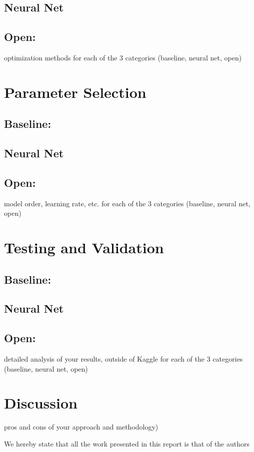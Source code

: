 \documentclass{acm_proc_article-sp}
\begin{document}
\subsection{Neural Net}

\subsection{Open: }
optimization methods  for each of the 3 categories (baseline, neural net, open)


\section{Parameter Selection}



\subsection{Baseline: }

\subsection{Neural Net}

\subsection{Open: }
model	order,	learning	rate,	etc.  for each of the 3 categories (baseline, neural net, open)

\section{Testing and Validation}


\subsection{Baseline: }

\subsection{Neural Net}

\subsection{Open: }
detailed	analysis of	your	results,	outside	of	Kaggle  for each of the 3 categories (baseline, neural net, open)



\section{Discussion}
pros and cons	of	your	approach and	methodology)


We	hereby	state	that	all	the	work	 presented	in	this	report	is	that	of	the	authors

  
\end{document}
